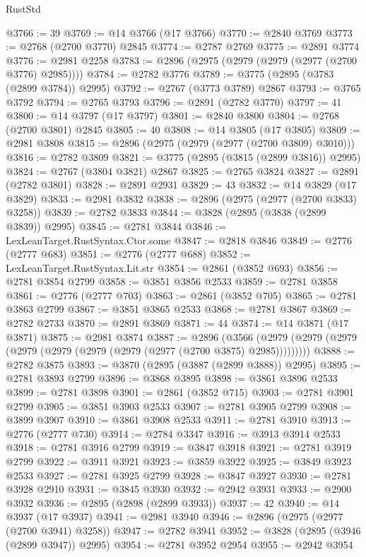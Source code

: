 \begin{lexlean}{RustStd}
\begin{coremodule}
@3766 := 39
@3769 := @14 @3766 (@17 @3766)
@3770 := @2840 @3769
@3773 := @2768 (@2700 @3770) @2845
@3774 := @2787 @2769
@3775 := @2891 @3774
@3776 := @2981 @2258
@3783 := @2896 (@2975 (@2979 (@2979 (@2977 (@2700 @3776) @2985))))
@3784 := @2782 @3776
@3789 := @3775 (@2895 (@3783 (@2899 @3784)) @2995)
@3792 := @2767 (@3773 @3789) @2867
@3793 := @3765 @3792
@3794 := @2765 @3793
@3796 := @2891 (@2782 @3770)
@3797 := 41
@3800 := @14 @3797 (@17 @3797)
@3801 := @2840 @3800
@3804 := @2768 (@2700 @3801) @2845
@3805 := 40
@3808 := @14 @3805 (@17 @3805)
@3809 := @2981 @3808
@3815 := @2896 (@2975 (@2979 (@2977 (@2700 @3809) @3010)))
@3816 := @2782 @3809
@3821 := @3775 (@2895 (@3815 (@2899 @3816)) @2995)
@3824 := @2767 (@3804 @3821) @2867
@3825 := @2765 @3824
@3827 := @2891 (@2782 @3801)
@3828 := @2891 @2931
@3829 := 43
@3832 := @14 @3829 (@17 @3829)
@3833 := @2981 @3832
@3838 := @2896 (@2975 (@2977 (@2700 @3833) @3258))
@3839 := @2782 @3833
@3844 := @3828 (@2895 (@3838 (@2899 @3839)) @2995)
@3845 := @2781 @3844
@3846 := LexLeanTarget.RustSyntax.Ctor.some
@3847 := @2818 @3846
@3849 := @2776 (@2777 @683)
@3851 := @2776 (@2777 @688)
@3852 := LexLeanTarget.RustSyntax.Lit.str
@3854 := @2861 (@3852 @693)
@3856 := @2781 @3854 @2799
@3858 := @3851 @3856 @2533
@3859 := @2781 @3858
@3861 := @2776 (@2777 @703)
@3863 := @2861 (@3852 @705)
@3865 := @2781 @3863 @2799
@3867 := @3851 @3865 @2533
@3868 := @2781 @3867
@3869 := @2782 @2733
@3870 := @2891 @3869
@3871 := 44
@3874 := @14 @3871 (@17 @3871)
@3875 := @2981 @3874
@3887 := @2896
    (@3566 (@2979 (@2979 (@2979 (@2979 (@2979 (@2979 (@2979 (@2977 (@2700 @3875) @2985)))))))))
@3888 := @2782 @3875
@3893 := @3870 (@2895 (@3887 (@2899 @3888)) @2995)
@3895 := @2781 @3893 @2799
@3896 := @3868 @3895
@3898 := @3861 @3896 @2533
@3899 := @2781 @3898
@3901 := @2861 (@3852 @715)
@3903 := @2781 @3901 @2799
@3905 := @3851 @3903 @2533
@3907 := @2781 @3905 @2799
@3908 := @3899 @3907
@3910 := @3861 @3908 @2533
@3911 := @2781 @3910
@3913 := @2776 (@2777 @730)
@3914 := @2784 @3347
@3916 := @3913 @3914 @2533
@3918 := @2781 @3916 @2799
@3919 := @3847 @3918
@3921 := @2781 @3919 @2799
@3922 := @3911 @3921
@3923 := @3859 @3922
@3925 := @3849 @3923 @2533
@3927 := @2781 @3925 @2799
@3928 := @3847 @3927
@3930 := @2781 @3928 @2910
@3931 := @3845 @3930
@3932 := @2942 @3931
@3933 := @2900 @3932
@3936 := @2895 (@2898 (@2899 @3933))
@3937 := 42
@3940 := @14 @3937 (@17 @3937)
@3941 := @2981 @3940
@3946 := @2896 (@2975 (@2977 (@2700 @3941) @3258))
@3947 := @2782 @3941
@3952 := @3828 (@2895 (@3946 (@2899 @3947)) @2995)
@3954 := @2781 @3952 @2954
@3955 := @2942 @3954

\end{coremodule}
\end{lexlean}
